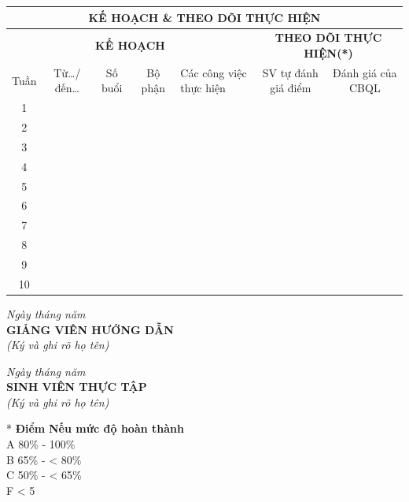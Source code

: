\documentclass[12pt, a4paper]{article}
\begin{document}
\vspace{0.5cm}
\noindent
\begin{tabularx}{\textwidth}{|c|c|c|c|X|c|c|}
\hline
\multicolumn{7}{|c|}{\textbf{KẾ HOẠCH \& THEO DÕI THỰC HIỆN}} \\
\hline
\multicolumn{5}{|c|}{\textbf{KẾ HOẠCH}} & \multicolumn{2}{c|}{\textbf{THEO DÕI THỰC HIỆN(*)}} \\
\hline
Tuần & Từ\dots/đến\dots & Số buổi & Bộ phận & Các công việc thực hiện & SV tự đánh giá điểm & Đánh giá của CBQL \\
\hline
1 & & & & & & \\ \hline
2 & & & & & & \\ \hline
3 & & & & & & \\ \hline
4 & & & & & & \\ \hline
5 & & & & & & \\ \hline
6 & & & & & & \\ \hline
7 & & & & & & \\ \hline
8 & & & & & & \\ \hline
9 & & & & & & \\ \hline
10 & & & & & & \\ \hline
\end{tabularx}

\vspace{1cm}
\noindent
\begin{minipage}[t]{0.5\textwidth}
\centering
\textit{Ngày \makebox[1cm]{\dotfill} tháng \makebox[1cm]{\dotfill} năm \makebox[1cm]{\dotfill}}\\
\textbf{GIẢNG VIÊN HƯỚNG DẪN}\\
\textit{(Ký và ghi rõ họ tên)}
\end{minipage}%
\begin{minipage}[t]{0.5\textwidth}
\centering
\textit{Ngày \makebox[1cm]{\dotfill} tháng \makebox[1cm]{\dotfill} năm \makebox[1cm]{\dotfill}}\\
\textbf{SINH VIÊN THỰC TẬP}\\
\textit{(Ký và ghi rõ họ tên)}
\end{minipage}

\vspace{3cm}
\noindent
* \textbf{Điểm} \hspace{1cm} \textbf{Nếu mức độ hoàn thành}\\
\hspace*{0.5cm} A \hspace{1.5cm} 80\% - 100\%\\
\hspace*{0.5cm} B \hspace{1.5cm} 65\% - < 80\%\\
\hspace*{0.5cm} C \hspace{1.5cm} 50\% - < 65\%\\
\hspace*{0.5cm} F \hspace{1.5cm} < 5
\end{document}
